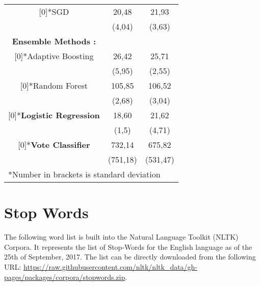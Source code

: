\begin{appendices}
\begin{table}[htbp]
\begin{tabular}{c|cc}
		 		\vspace*{-2mm}
		 		\multirow{2}[0]{*}{SGD} & 20,48 & 21,93 \\
			 					       & (4,04) & (3,63) \\
			 	\cline{1-1}
			 	\textbf{Ensemble Methods :}&&\\
			 	\cline{1-1}				       
		 		\vspace*{-2mm}
 				\multirow{2}[0]{*}{Adaptive Boosting}& 26,42 & 25,71 \\
		 		       & (5,95) & (2,55) \\
		 		\vspace*{-2mm}
		 		\multirow{2}[0]{*}{Random Forest} & 105,85 & 106,52 \\
		 		       & (2,68) & (3,04) \\
		 		\hline\vspace*{-2mm}
		 		\multirow{2}[0]{*}{\textbf{Logistic Regression}}& 18,60 & 21,62 \\
		 		     & (1,5) & (4,71) \\
		 		\hline\vspace*{-2mm}
		 		\multirow{2}[0]{*}{\textbf{Vote Classifier}} & 732,14 & 675,82 \\
		 		      & (751,18) & (531,47) \\
		 		\hline\hline
		 		\multicolumn{3}{l}{*Number in brackets is standard deviation}
		 		
		 	\end{tabular}%
		 	\label{tab:dur_by_type}%
		 \end{table}%
	 	\newpage
	 	
	\section{Stop Words}
		The following word list is built into the Natural Language Toolkit (NLTK) Corpora. It represents the list of Stop-Words for the English language as of the 25th of September, 2017. The list can be directly downloaded from the following URL:  \url{https://raw.githubusercontent.com/nltk/nltk_data/gh-pages/packages/corpora/stopwords.zip}.
	

\end{appendices}
